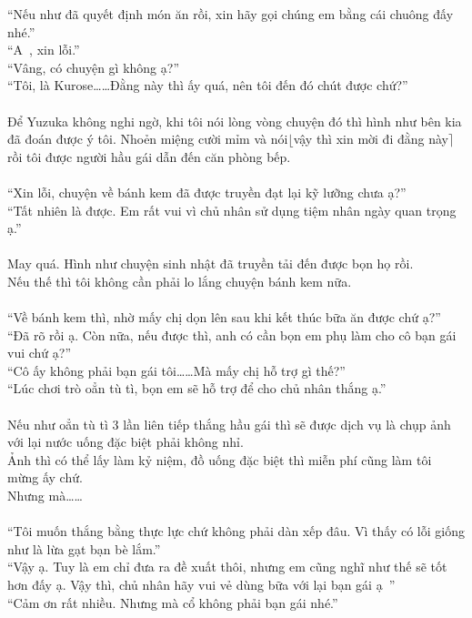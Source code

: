 \documentclass[12pt,a4paper, twosides]{book}
\begin{document}
“Nếu như đã quyết định món ăn rồi, xin hãy gọi chúng em bằng cái chuông đấy nhé.”\\
“A~, xin lỗi.”\\
“Vâng, có chuyện gì không ạ?”\\
“Tôi, là Kurose……Đằng này thì ấy quá, nên tôi đến đó chút được chứ?”\\
\\
Để Yuzuka không nghi ngờ, khi tôi nói lòng vòng chuyện đó thì hình như bên kia đã đoán được ý tôi. Nhoẻn miệng cười mỉm và nói$\lfloor$vậy thì xin mời đi đằng này$\rceil$rồi tôi được người hầu gái dẫn đến căn phòng bếp.\\
\\
“Xin lỗi, chuyện về bánh kem đã được truyền đạt lại kỹ lưỡng chưa ạ?”\\
“Tất nhiên là được. Em rất vui vì chủ nhân sử dụng tiệm nhân ngày quan trọng ạ.”\\
\\
May quá. Hình như chuyện sinh nhật đã truyền tải đến được bọn họ rồi.\\
Nếu thế thì tôi không cần phải lo lắng chuyện bánh kem nữa.\\
\\
“Về bánh kem thì, nhờ mấy chị dọn lên sau khi kết thúc bữa ăn được chứ ạ?”\\
“Đã rõ rồi ạ. Còn nữa, nếu được thì, anh có cần bọn em phụ làm cho cô bạn gái vui chứ ạ?”\\
“Cô ấy không phải bạn gái tôi……Mà mấy chị hỗ trợ gì thế?”\\
“Lúc chơi trò oẳn tù tì, bọn em sẽ hỗ trợ để cho chủ nhân thắng ạ.”\\
\\
Nếu như oẳn tù tì 3 lần liên tiếp thắng hầu gái thì sẽ được dịch vụ là chụp ảnh với lại nước uống đặc biệt phải không nhỉ.\\
Ảnh thì có thể lấy làm kỷ niệm, đồ uống đặc biệt thì miễn phí cũng làm tôi mừng ấy chứ.\\
Nhưng mà……\\
\\
“Tôi muốn thắng bằng thực lực chứ không phải dàn xếp đâu. Vì thấy có lỗi giống như là lừa gạt bạn bè lắm.”\\
“Vậy ạ. Tuy là em chỉ đưa ra đề xuất thôi, nhưng em cũng nghĩ như thế sẽ tốt hơn đấy ạ. Vậy thì, chủ nhân hãy vui vẻ dùng bữa với lại bạn gái ạ~”\\
“Cảm ơn rất nhiều. Nhưng mà cổ không phải bạn gái nhé.”\\
\\
\end{document}
